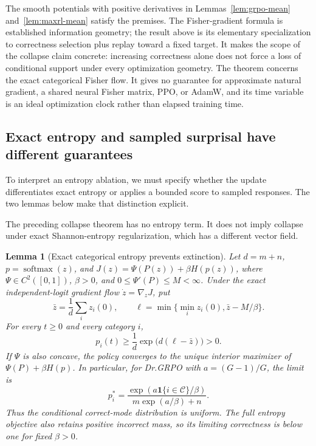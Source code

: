 \documentclass{article}
\newcommand{\1}{\mathbf 1}
\newtheorem{lemma}{Lemma}[section]
\theoremstyle{remark}
\theoremstyle{definition}
\theoremstyle{plain}
\begin{document}
The smooth potentials with positive derivatives in
Lemmas~\ref{lem:grpo-mean} and~\ref{lem:maxrl-mean} satisfy the premises. The Fisher-gradient formula
is established information geometry; the result above is its elementary
specialization to correctness selection plus replay toward a fixed target.
It makes the scope of the collapse claim concrete: increasing correctness
alone does not force a loss of conditional support under every optimization
geometry. The theorem concerns the exact categorical Fisher flow. It gives
no guarantee for approximate natural gradient, a shared neural Fisher
matrix, PPO, or AdamW, and its time variable is an ideal optimization clock
rather than elapsed training time.

\subsection{Exact entropy and sampled surprisal have different guarantees}
\label{app:theory-entropy}


To interpret an entropy ablation, we must specify whether the update
differentiates exact entropy or applies a bounded score to sampled responses.
The two lemmas below make that distinction explicit.

The preceding collapse theorem has no entropy term. It does not imply collapse
under exact Shannon-entropy regularization, which has a different vector field.

\begin{lemma}[Exact categorical entropy prevents extinction]
\label{lem:entropy-scope}
Let $d=m+n$, $p=\operatorname{softmax}(z)$, and
$J(z)=\Psi(P(z))+\beta H(p(z))$, where $\Psi\in C^2([0,1])$, $\beta>0$, and
$0\le\Psi'(P)\le M<\infty$. Under the exact independent-logit gradient flow
$\dot z=\nabla_zJ$, put
\[
 \bar z=\frac1d\sum_i z_i(0),\qquad
 \ell=\min\{\min_i z_i(0),\bar z-M/\beta\}.
\]
For every $t\ge0$ and every category $i$,
\[
 p_i(t)\ge \frac1d\exp\!\bigl(d(\ell-\bar z)\bigr)>0.
\]
If $\Psi$ is also concave, the policy
converges to the unique interior maximizer of $\Psi(P)+\beta H(p)$.
In particular, for Dr.GRPO with $a=(G-1)/G$, the limit is
\[
 p_i^*=\frac{\exp(a\1\{i\in\mathcal C\}/\beta)}
 {m\exp(a/\beta)+n}.
\]
Thus the conditional correct-mode distribution is uniform. The full entropy
objective also retains positive incorrect mass, so its limiting correctness
is below one for fixed $\beta>0$.
\end{lemma}
\end{document}
